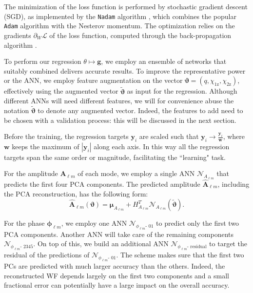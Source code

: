 \documentclass[twocolumn,showpacs,preprintnumbers,nofootinbib,prd,
superscriptaddress,10pt]{revtex4-2}
\begin{document}
The minimization of the loss function is performed by stochastic gradient descent (SGD), as implemented by the \texttt{Nadam} algorithm \cite{dozat.2016}, which combines the popular \texttt{Adam} algorithm \cite{Kingma2014AdamAM} with the Nesterov momentum. The optimization relies on the gradients $\partial_W \mathcal{L}$ of the loss function, computed through the 
back-propagation algorithm \cite{backprop}.

To perform our regression $\theta \longmapsto \boldsymbol{g}$, we employ an ensemble of networks that suitably combined delivers accurate results.
To improve the representative power or the ANN, we employ feature augmentation on the vector $\boldsymbol{\vartheta} = (q, \chi_\text{1z}, \chi_\text{2z})$, effectively using the augmented vector $\tilde{\boldsymbol{\vartheta}}$ as input for the regression. Although different ANNs will need different features, we will for convenience 
abuse the notation $\tilde{\boldsymbol{\vartheta}}$ to denote any augmented vector. Indeed, the features to add need to be chosen with a validation process: this will be discussed in the next section.

Before the training, the regression targets $\boldsymbol{y}_i$ are scaled such that $\boldsymbol{y}_i \rightarrow \frac{\boldsymbol{y}_i}{\boldsymbol{w}}$, where $\boldsymbol{w}$ keeps the maximum of $|\boldsymbol{y}_i|$ along each axis. %
In this way all the regression targets span the same order or magnitude, facilitating the ``learning" task.

For the amplitude $\boldsymbol{A}_{\ell m}$ of each mode, we employ a single ANN $\mathcal{N}_{A_{\ell m}}$ that predicts the first four PCA components.
The predicted amplitude $\hat{\boldsymbol{A}}_{\ell m}$, including the PCA reconstruction, has the following form:
\begin{equation}\label{eq:amp_pred}
	\hat{\boldsymbol{A}}_{\ell m}(\boldsymbol{\vartheta}) = \boldsymbol{\mu}_{A_{\ell m}} + H_{A_{\ell m}}^T \mathcal{N}_{A_{\ell m}}(\tilde{\boldsymbol{\vartheta}}).
\end{equation}

For the phase $\boldsymbol{\phi}_{\ell m}$, we employ one ANN $\mathcal{N}_{\phi_{\ell m}\text{- 01}}$ to predict only the first two PCA components.
Another ANN will take care of the remaining components $\mathcal{N}_{\phi_{\ell m}\text{- 2345}}$.
On top of this, we build an additional ANN $\mathcal{N}_{\phi_{\ell m}\text{- residual}}$ to target the residual of the predictions of $\mathcal{N}_{\phi_{\ell m}\text{- 01}}$.
The scheme makes sure that the first two PCs are predicted with much larger accuracy than the others. Indeed, the reconstructed WF depends largely on the first two components and a small fractional error can potentially have a large impact on the overall accuracy.
\end{document}
